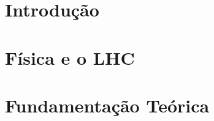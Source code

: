 \documentclass[
	11pt,				%
	openright,			%
	twoside,			%
	a4paper,			%
	english,			%
	french,				%
	spanish,			%
	brazil				%
	]{abntex2}          %
\begin{document}

\textual

\chapter[Introdução]{Introdução}\label{chap:introducao}



\chapter[Física e o LHC]{Física e o LHC}\label{chap:pesquisa}



\chapter[Fundamentação Teórica]{Fundamentação Teórica}\label{chap:tecnicas}
\end{document}
